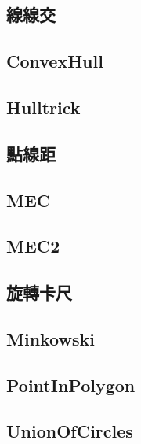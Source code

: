\documentclass[a4paper,10pt,twocolumn,oneside]{article}
\begin{document}
    \subsection{線線交}
    

    \subsection{ConvexHull}
    

    \subsection{Hulltrick}
    

    \subsection{點線距}
    

    \subsection{MEC}
    

    \subsection{MEC2}
    

    \subsection{旋轉卡尺}
    
    
    \subsection{Minkowski}
    

    \subsection{PointInPolygon}
    

    \subsection{UnionOfCircles}
    
\end{document}
